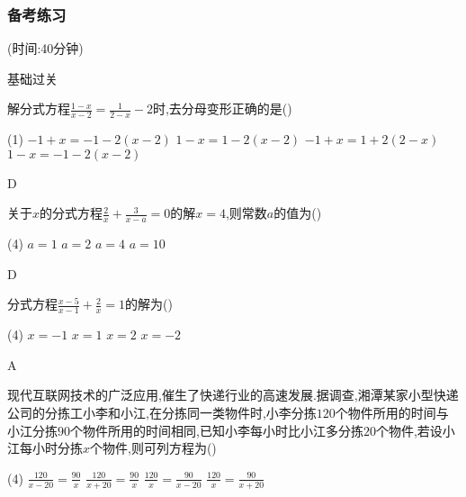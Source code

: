\documentclass[cn,blue,12pt]{elegantbook}
\begin{document}
\subsubsection{备考练习}%
(时间:40分钟)
\begin{shiti}
\item 基础过关
    \begin{shiti}
    \item 解分式方程\(\frac{1-x}{x-2}=\frac{1}{2-x}-2\)时,去分母变形正确的是(\qquad)\\
        \begin{tasks}(1)
            \task \(-1+x= -1-2( x - 2)\)
            \task \(1-x = 1-2(x-2)\)
            \task \(-1+x = 1+2(2-x)\)
            \task \(1-x= -1-2(x-2)\)
        \end{tasks}
\begin{solution}
            D
\end{solution}
    \item 关于\(x\)的分式方程\(\frac{2}{x}+\frac{3}{x-a}= 0\)的解\(x=4\),则常数\(a\)的值为(\qquad)\\
        \begin{tasks}(4)
            \task \(  a = 1  \)
            \task \(  a = 2  \)
            \task \(  a = 4  \)
            \task \(  a = 10\)
        \end{tasks}
\begin{solution}
            D
\end{solution}
    \item 分式方程\(\frac{x-5}{x-1} + \frac{2}{x} = 1\)的解为(\qquad)\\
        \begin{tasks}(4)
            \task \(x=-1\)
            \task \(x=1\)
            \task \(x=2\)
            \task \(x=-2\)
        \end{tasks}
\begin{solution}
            A
\end{solution}
    \item 现代互联网技术的广泛应用,催生了快递行业的高速发展.据调查,湘潭某家小型快递公司的分拣工小李和小江,在分拣同一类物件时,小李分拣\(120\)个物件所用的时间与小江分拣\(90\)个物件所用的时间相同,已知小李每小时比小江多分拣\(20\)个物件,若设小江每小时分拣\(x\)个物件,则可列方程为(\qquad)\\
        \begin{tasks}(4)
            \task \(\frac{120}{x-20}=\frac{90}{x}\)
            \task \(\frac{120}{x+20}=\frac{90}{x}\)
            \task \(\frac{120}{x}=\frac{90}{x-20}\)
            \task \(\frac{120}{x}=\frac{90}{x+20}\)

\end{tasks}
\end{shiti}
\end{shiti}
\end{document}

